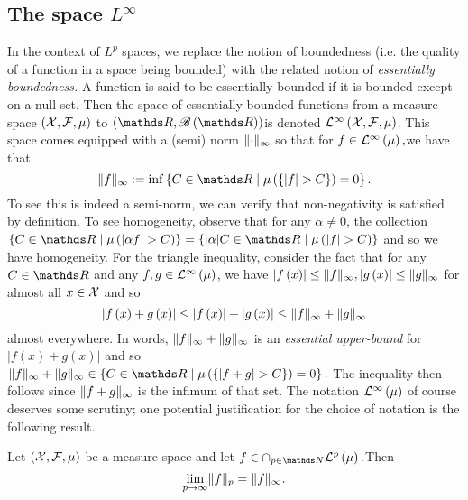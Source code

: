 \subsection{The space $L^{\infty}$}

In the context of $L^{p}$ spaces, we replace the notion of boundedness
(i.e. the quality of a function in a space being bounded) with the
related notion of \emph{essentially boundedness. }A function is said
to be essentially bounded if it is bounded except on a null set. Then
the space of essentially bounded functions from a measure space $\left(\mathcal{X},\mathcal{F},\mu\right)$
to $\left(\R,\borel\left(\R\right)\right)$is denoted $\mathcal{L}^{\infty}\left(\mathcal{X},\mathcal{F},\mu\right)$.
This space comes equipped with a (semi) norm $\lVert\cdot\rVert_{\infty}$
so that for $f\in\mathcal{L}^{\infty}\left(\mu\right),$we have that 
\[
\pnorm f{\infty}:=\inf\left\{ C\in\R\mid\mu\left(\left\{ \lvert f\rvert>C\right\} \right)=0\right\} .
\]
To see this is indeed a semi-norm, we can verify that non-negativity
is satisfied by definition. To see homogeneity, observe that for any
$\alpha\neq0$, the collection $\left\{ C\in\R\mid\mu\left(\lvert\alpha f\rvert>C\right)\right\} =\left\{ \lvert\alpha\rvert C\in\R\mid\mu\left(\lvert f\rvert>C\right)\right\} $
and so we have homogeneity. For the triangle inequality, consider
the fact that for any $C\in\R$ and any $f,g\in\mathcal{L}^{\infty}\left(\mu\right)$,
we have $\lvert f\left(x\right)\rvert\leq\lVert f\rVert_{\infty},\lvert g\left(x\right)\rvert\leq\lVert g\rVert_{\infty}$
for almost all $x\in\mathcal{X}$ and so
\[
\lvert f\left(x\right)+g\left(x\right)\rvert\leq\lvert f\left(x\right)\rvert+\lvert g\left(x\right)\rvert\leq\lVert f\rVert_{\infty}+\lVert g\rVert_{\infty}
\]
almost everywhere. In words, $\lVert f\rVert_{\infty}+\lVert g\rVert_{\infty}$
is an \emph{essential upper-bound }for $\lvert f\left(x\right)+g\left(x\right)\rvert$
and so $\pnorm f{\infty}+\pnorm g{\infty}\in\left\{ C\in\R\mid\mu\left(\left\{ \lvert f+g\rvert>C\right\} \right)=0\right\} .$
The inequality then follows since $\lVert f+g\rVert_{\infty}$ is the infimum
of that set. The notation $\mathcal{L}^{\infty}\left(\mu\right)$ of course deserves some
scrutiny; one potential justification for the choice of notation is
the following result.
\begin{prop}
\label{prop:limLp}Let $\left(\mathcal{X},\mathcal{F},\mu\right)$ be a measure space and let
$f\in\cap_{p\in\N}\Lp p{\mu}.$Then 
\[
\lim_{p\to\infty}\lVert f\rVert_{p}=\lVert f\rVert_{\infty}.
\]
\end{prop}

